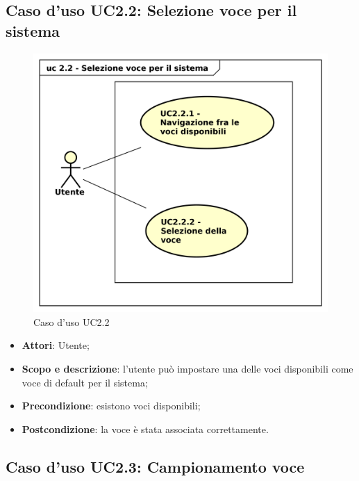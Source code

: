 \subsection{Caso d'uso UC2.2: Selezione voce per il sistema}

\begin{figure}[htbp]
\centering
\includegraphics[scale=0.5]{UseCase_17_03_2016/immagini/uc_2_2_selezione_voce_sistema.png}
\captionsetup{labelfont=bf}
\caption{Caso d'uso UC2.2}
\end{figure}

\begin{itemize}
\item \textbf{Attori}: Utente;
\item \textbf{Scopo e descrizione}: l'utente può impostare una delle voci disponibili come voce di default per il sistema;
\item \textbf{Precondizione}: esistono voci disponibili;
\item \textbf{Postcondizione}: la voce è stata associata correttamente.
\end{itemize}

\subsection{Caso d'uso UC2.3: Campionamento voce}

